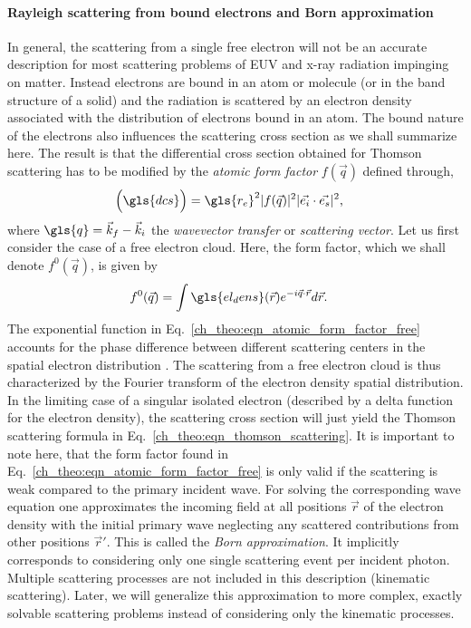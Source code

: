 \paragraph{Rayleigh scattering from bound electrons and Born approximation}
In general, the scattering from a single free electron will not be an accurate description for most scattering problems of EUV and x-ray radiation impinging on matter. Instead electrons are bound in an atom or molecule (or in the band structure of a solid) and the radiation is scattered by an electron density associated with the distribution of electrons bound in an atom. The bound nature of the electrons also influences the scattering cross section as we shall summarize here. The result is that the differential cross section obtained for Thomson scattering has to be modified by the \emph{atomic form factor} $f(\vec{q})$ defined through,
\begin{align}
\Big(\gls{dcs}\Big) &= \gls{r_e}^2 |f(\vec{q})|^2 |\vec{e_i} \cdot \vec{e_s}|^2 \text{,} \label{ch_theo:eqn_atomic_form_factor}
\end{align}
where $\gls{q} = \vec{k}_f - \vec{k}_{i}$ the \emph{wavevector transfer} or \emph{scattering vector}. Let us first consider the case of a free electron cloud. Here, the form factor, which we shall denote $f^{0}(\vec{q})$, is given by
\begin{align}
f^0(\vec{q}) &= \int \gls{el_dens}(\vec{r}) e^{- i \vec{q} \cdot \vec{r}} d \vec{r} \text{.} \label{ch_theo:eqn_atomic_form_factor_free}
\end{align}
The exponential function in Eq.~\eqref{ch_theo:eqn_atomic_form_factor_free} accounts for the phase difference between different scattering centers in the spatial electron distribution \cite{daillant_x-ray_2009}. The scattering from a free electron cloud is thus characterized by the Fourier transform of the electron density spatial distribution. In the limiting case of a singular isolated electron (described by a delta function for the electron density), the scattering cross section will just yield the Thomson scattering formula in Eq.~\eqref{ch_theo:eqn_thomson_scattering}. It is important to note here, that the form factor found in Eq.~\eqref{ch_theo:eqn_atomic_form_factor_free} is only valid if the scattering is weak compared to the primary incident wave. For solving the corresponding wave equation one approximates the incoming field at all positions $\vec{r}$ of the electron density with the initial primary wave neglecting any scattered contributions from other positions $\vec{r}'$. This is called the \emph{Born approximation}. It implicitly corresponds to considering only one single scattering event per incident photon. Multiple scattering processes are not included in this description (kinematic scattering). Later, we will generalize this approximation to more complex, exactly solvable scattering problems instead of considering only the kinematic processes.

